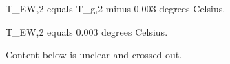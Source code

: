 T_EW,2 equals T_g,2 minus 0.003 degrees Celsius.  

T_EW,2 equals 0.003 degrees Celsius.  

Content below is unclear and crossed out.